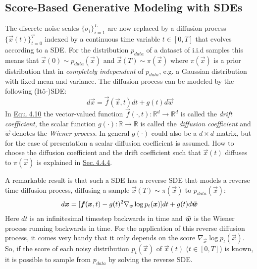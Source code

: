 \subsection{Score-Based Generative Modeling with SDEs} \label{sec:4.4.1}
The discrete noise scales $\{\sigma_i\}_{i=1}^L$ are now replaced by a diffusion process $\{\vec{x}(t)\}_{t=0}^T$ indexed by a continuous time variable $t\in[0,T]$ that evolves according to a SDE. For the distribution $p_{data}$ of a dataset of i.i.d samples this means that $\vec{x}(0)\sim p_{data}(\vec{x})$ and $\vec{x}(T)\sim \pi(\vec{x})$ where $\pi(\vec{x})$ is a prior distribution that in \textit{completely independent} of $p_{data}$, e.g. a Gaussian distribution with fixed mean and variance. The diffusion process can be modeled by the following (Itô-)SDE:
%
\begin{equation} \label{equ:4.10}
    d\vec{x}=\vec{f}(\vec{x},t)dt+g(t)d\vec{w}
\end{equation}
%
In \hyperref[equ:4.10]{Equ.\,4.10} the vector-valued function $\vec{f}(\cdot,t):\mathbb{R}^d\rightarrow\mathbb{R}^d$ is called the \textit{drift coefficient}, the scalar function $g(\cdot):\mathbb{R}\rightarrow\mathbb{R}$ is called the \textit{diffusion coefficient} and $\vec{w}$ denotes the \textit{Wiener process}. In general $g(\cdot)$ could also be a $d\times d$ matrix, but for the ease of presentation a scalar diffusion coefficient is assumed. How to choose the diffusion coefficient and the drift coefficient such that $\vec{x}(t)$ diffuses to $\pi(\vec{x})$ is explained in \hyperref[sec:4.4.4]{Sec.\,4.4.4}.

A remarkable result \cite{ANDERSON} is that such a SDE has a reverse SDE that models a reverse time diffusion process, diffusing a sample $\vec{x}(T)\sim\pi(\vec{x})$ to $p_{data}(\vec{x})$:
%
\begin{equation} \label{equ:4.11}
    d\vec{x}=[\vec{f}(\vec{x},t)-g(t)^2\nabla_{\vec{x}}\log p_t(\vec{x})]dt+g(t)d\vec{\Bar{w}}
\end{equation}
%
Here $dt$ is an infinitesimal timestep backwards in time and $\vec{\Bar{w}}$ is the Wiener process running backwards in time. For the application of this reverse diffusion process, it comes very handy that it only depends on the score $\nabla_{\vec{x}}\log p_t(\vec{x})$. So, if the score of each noisy distribution $p_t(\vec{x})$ of $\vec{x}(t)$ ($t\in[0, T]$) is known, it is possible to sample from $p_{data}$ by solving the reverse SDE.
%
